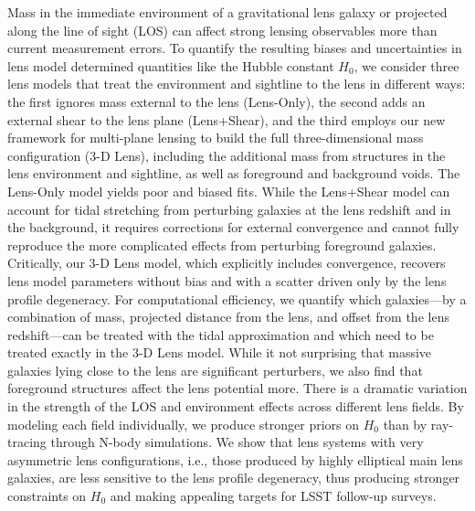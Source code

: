 Mass in the immediate environment of a gravitational lens galaxy or projected along the line of sight (LOS) can affect strong lensing observables more than current measurement errors. To quantify the resulting biases and uncertainties in lens model determined quantities like the Hubble constant $H_0$, we consider three lens models that treat the environment and sightline to the lens in different ways: the first ignores mass external to the lens (Lens-Only), the second adds an external shear to the lens plane (Lens+Shear), and the third employs our new 
framework for multi-plane lensing \citep{McCully14} to build the full three-dimensional mass configuration (3-D Lens), including the additional mass from structures in the lens environment and sightline, as well as foreground and background voids.  The Lens-Only model yields poor and biased fits.  While the Lens+Shear model can 
account for tidal stretching from perturbing galaxies at the lens redshift and in the background, it requires corrections for external convergence and cannot fully reproduce the more 
complicated effects from perturbing foreground galaxies.  Critically, our 3-D Lens model, which explicitly includes convergence, recovers lens model parameters without bias and with a scatter driven only by the lens profile degeneracy.  For computational efficiency, we quantify which galaxies---by a combination of mass, projected distance from the lens, and offset from the lens redshift---can be treated with the tidal approximation and which need to be treated exactly in the 3-D Lens model.  While it not surprising that massive galaxies lying close to the lens are significant perturbers, we also find that foreground structures affect the lens potential more.
There is a dramatic variation in the strength of the LOS and environment effects across different lens fields.  By modeling each field 
individually, we produce stronger priors on $H_0$ than by ray-tracing through N-body simulations.  We show that lens systems with very asymmetric lens configurations, i.e., those produced by highly elliptical main lens galaxies, are less sensitive to the lens profile degeneracy, thus producing stronger constraints on $H_0$ and making appealing targets for LSST follow-up surveys.
  
  
  